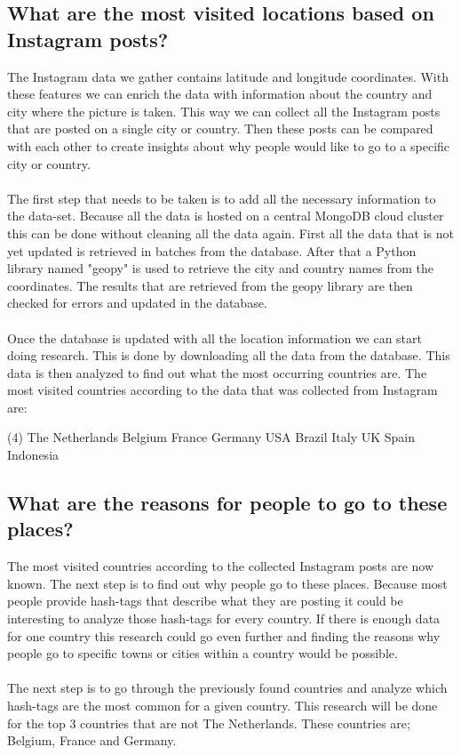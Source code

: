 \documentclass{article}
\begin{document}
\subsection{What are the most visited locations based on Instagram posts?}
The Instagram data we gather contains latitude and longitude coordinates. With these features we can enrich the data with information about the country and city where the picture is taken. This way we can collect all the Instagram posts that are posted on a single city or country. Then these posts can be compared with each other to create insights about why people would like to go to a specific city or country.\\\\
The first step that needs to be taken is to add all the necessary information to the data-set. Because all the data is hosted on a central MongoDB cloud cluster this can be done without cleaning all the data again. First all the data that is not yet updated is retrieved in batches from the database. After that a Python library named "geopy" is used to retrieve the city and country names from the coordinates. The results that are retrieved from the geopy library are then checked for errors and updated in the database.\\\\
Once the database is updated with all the location information we can start doing research. This is done by downloading all the data from the database. This data is then analyzed to find out what the most occurring countries are. The most visited countries according to the data that was collected from Instagram are:

\begin{tasks}[counter-format={tsk[1].}, label-align=left, label-offset={0mm}, label-width={5mm}, item-indent={5mm}, label-format={\bfseries}, column-sep=10mm](4)
\task The Netherlands
\task Belgium
\task France
\task Germany
\task USA
\task Brazil
\task Italy
\task UK
\task Spain
\task Indonesia
\end{tasks}

\subsection{What are the reasons for people to go to these places?}
The most visited countries according to the collected Instagram posts are now known. The next step is to find out why people go to these places. Because most people provide hash-tags that describe what they are posting it could be interesting to analyze those hash-tags for every country. If there is enough data for one country this research could go even further and finding the reasons why people go to specific towns or cities within a country would be possible.\\\\
The next step is to go through the previously found countries and analyze which hash-tags are the most common for a given country. This research will be done for the top 3 countries that are not The Netherlands. These countries are; Belgium, France and Germany.
\end{document}
